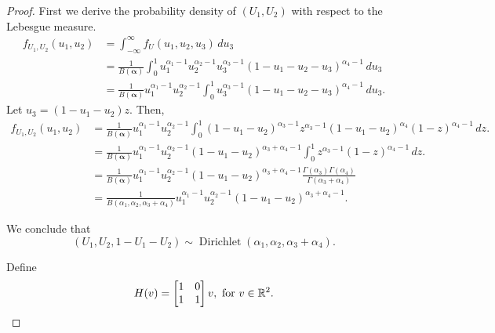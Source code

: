 \begin{proof}
  First we derive the probability density of $(U_1, U_2)$ with respect to the
  Lebesgue measure. 
  \begin{equation}
    \label{eq:dist-u1-u2}
    \begin{split}
      f_{U_1, U_2}(u_1, u_2) &= \int_{-\infty}^{\infty} f_{U}(u_1,u_2,u_3) \, du_3 \\ 
      &= \frac{1}{B(\boldsymbol{\alpha})}\int_0^1 u_1^{\alpha_1-1}u_2^{\alpha_2-1}u_3^{\alpha_3-1}(1-u_1-u_2-u_3)^{\alpha_4-1} \, du_3 \\
      &= \frac{1}{B(\boldsymbol{\alpha})}u_1^{\alpha_1-1}u_2^{\alpha_2-1}\int_0^1 u_3^{\alpha_3-1}(1-u_1-u_2-u_3)^{\alpha_4-1} \, du_3.
    \end{split}
  \end{equation}
  Let $u_3 = (1 - u_1 - u_2)z$. Then,
  \begin{equation}
    \begin{split}
      f_{U_1, U_2}(u_1, u_2) &= \frac{1}{B(\boldsymbol{\alpha})}u_1^{\alpha_1-1}u_2^{\alpha_2-1}\int_0^1 (1-u_1-u_2)^{\alpha_3-1}z^{\alpha_3-1}(1-u_1-u_2)^{\alpha_4}(1-z)^{\alpha_4-1} \, dz. \\
      &= \frac{1}{B(\boldsymbol{\alpha})}u_1^{\alpha_1-1}u_2^{\alpha_2-1}(1-u_1-u_2)^{\alpha_3+\alpha_4-1}\int_0^1 z^{\alpha_3-1}(1-z)^{\alpha_4-1} \, dz. \\
      &= \frac{1}{B(\boldsymbol{\alpha})}u_1^{\alpha_1-1}u_2^{\alpha_2-1}(1-u_1-u_2)^{\alpha_3+\alpha_4-1}\frac{\Gamma(\alpha_3)\Gamma(\alpha_4)}{\Gamma(\alpha_3 + \alpha_4)} \\
      &= \frac{1}{B(\alpha_1, \alpha_2, \alpha_3+\alpha_4)}u_1^{\alpha_1-1}u_2^{\alpha_2-1}(1-u_1-u_2)^{\alpha_3+\alpha_4-1}.
    \end{split}
  \end{equation}

We conclude that
$$(U_1, U_2, 1-U_1-U_2) \sim
\operatorname{Dirichlet}(\alpha_1,\alpha_2,\alpha_3+\alpha_4).$$

Define 
$$
H(v) = \begin{bmatrix}
  1 & 0 \\ 1 & 1
\end{bmatrix}v, \text{ for } v \in \mathbb{R}^2.
$$


\end{proof}
